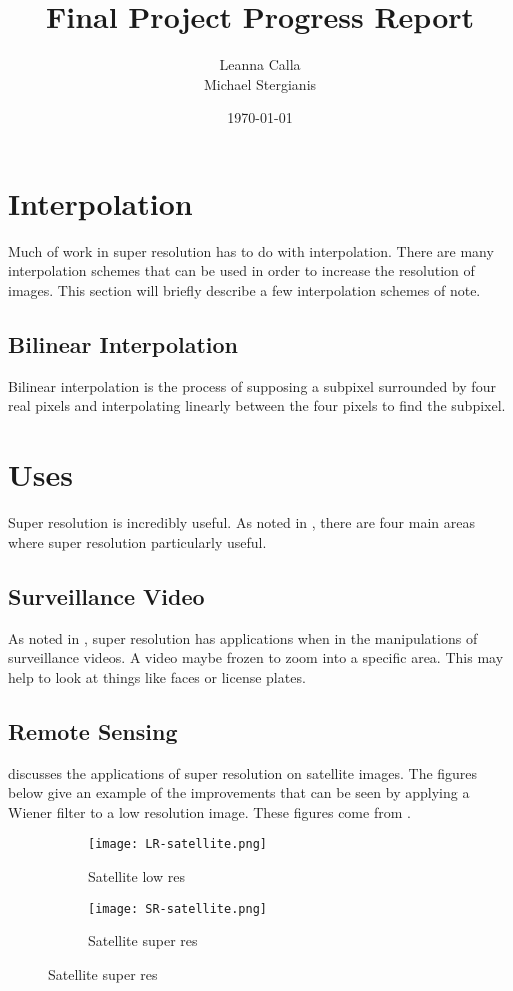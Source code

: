 \documentclass{article}
\title{Final Project Progress Report}
\author{Leanna Calla\\Michael Stergianis}
\date{\today}
\begin{document}
\maketitle

\section{Interpolation}
\label{sec:interpolation}
Much of work in super resolution has to do with interpolation.  There
are many interpolation schemes that can be used in order to increase
the resolution of images. This section will briefly describe a few
interpolation schemes of note.
%
\subsection{Bilinear Interpolation}
\label{subsec:bilinear}
Bilinear interpolation is the process of supposing a subpixel
surrounded by four real pixels and interpolating linearly between the
four pixels to find the subpixel.
%
%
\section{Uses}
\label{sec:uses}

Super resolution is incredibly useful. As noted in
\cite{Yang2010ImageSH}, there are four main areas where super
resolution particularly useful.
\subsection{Surveillance Video}
As noted in \cite{Yang2010ImageSH}, super resolution has applications
when in the manipulations of surveillance videos. A video maybe frozen
to zoom into a specific area. This may help to look at things like faces or license plates.
\subsection{Remote Sensing}
\cite{Li} discusses the applications of super resolution on satellite
images. The figures below give an example of the improvements that can
be seen by applying a Wiener filter to a low resolution image. These
figures come from \cite{Li}.    
\begin{figure}[H]
  \centering
  \begin{subfigure}[b]{0.5\textwidth}
    \centering
  \texttt{[image: LR-satellite.png]}
  \caption{\label{fig:label} Satellite low res }
\end{subfigure}%
\begin{subfigure}[b]{0.5\textwidth}
  \centering
  \texttt{[image: SR-satellite.png]}
  \caption{\label{fig:label} Satellite super res }
  \end{subfigure}
\end{figure}
\end{document}
